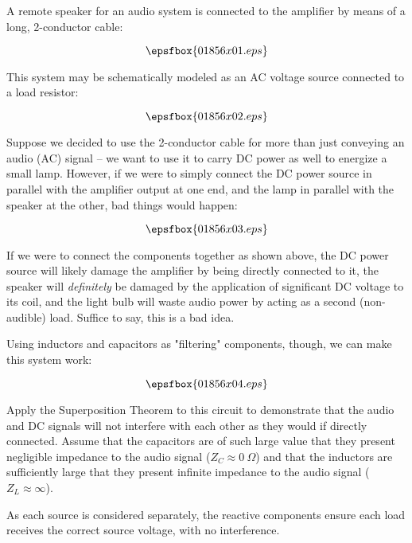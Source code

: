 

A remote speaker for an audio system is connected to the amplifier by means of a long, 2-conductor cable:

$$\epsfbox{01856x01.eps}$$

This system may be schematically modeled as an AC voltage source connected to a load resistor:

$$\epsfbox{01856x02.eps}$$

Suppose we decided to use the 2-conductor cable for more than just conveying an audio (AC) signal -- we want to use it to carry DC power as well to energize a small lamp.  However, if we were to simply connect the DC power source in parallel with the amplifier output at one end, and the lamp in parallel with the speaker at the other, bad things would happen:

$$\epsfbox{01856x03.eps}$$

If we were to connect the components together as shown above, the DC power source will likely damage the amplifier by being directly connected to it, the speaker will {\it definitely} be damaged by the application of significant DC voltage to its coil, and the light bulb will waste audio power by acting as a second (non-audible) load.  Suffice to say, this is a bad idea.

Using inductors and capacitors as "filtering" components, though, we can make this system work:

$$\epsfbox{01856x04.eps}$$

Apply the Superposition Theorem to this circuit to demonstrate that the audio and DC signals will not interfere with each other as they would if directly connected.  Assume that the capacitors are of such large value that they present negligible impedance to the audio signal ($Z_C \approx 0 \> \Omega$) and that the inductors are sufficiently large that they present infinite impedance to the audio signal ($Z_L \approx \infty$).







As each source is considered separately, the reactive components ensure each load receives the correct source voltage, with no interference.

